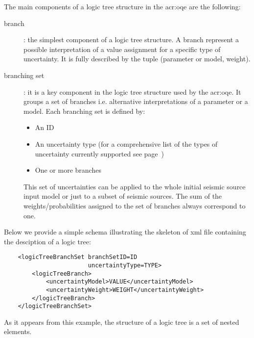 The main components of a logic tree structure in the \glsdesc{acr:oqe} are the
following:

\begin{description}

    \item[branch]: the simplest component of a logic tree structure. A branch
	represent a possible interpretation of a value assignment for a specific type
	of uncertainty. It is fully described by the tuple (parameter or model,
	weight).

    \item[branching set]: it is a key component in the logic tree structure
	used by the \gls{acr:oqe}. It groups a set of branches i.e. alternative
	interpretations of a parameter or a model. Each branching set is defined by:

    \begin{itemize}

        \item An ID

        \item An uncertainty type (for a comprehensive list of the types of
		uncertainty currently supported see page~\pageref{list_epistemic_unc})

        \item One or more branches

    \end{itemize}

    This set of uncertainties can be applied to the whole initial  seismic
    source input model or just to a subset of seismic sources. The sum of the
    weights/probabilities assigned to the set  of branches always correspond
    to one.

\end{description}

Below we provide a simple schema illustrating the skeleton of xml file
containing the desciption of a logic tree:

\begin{verbatim}
    <logicTreeBranchSet branchSetID=ID
                        uncertaintyType=TYPE>
        <logicTreeBranch>
            <uncertaintyModel>VALUE</uncertaintyModel>
            <uncertaintyWeight>WEIGHT</uncertaintyWeight>
        </logicTreeBranch>
    </logicTreeBranchSet>
\end{verbatim}

As it appears from this example, the structure of a logic tree is a set of
nested elements.

